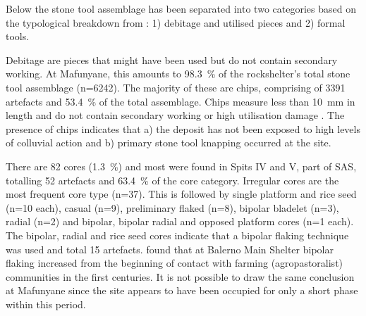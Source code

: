 \documentclass{ijsra}
\begin{document}
Below the stone tool assemblage has been separated into two categories based on the typological breakdown from \textcite{Walker_1994}: 1) debitage and utilised pieces and 2) formal tools.

Debitage are  pieces that might have been used but do not contain secondary working. 
At Mafunyane, this amounts to \SI{98.3}{\percent} of the rockshelter’s total stone tool assemblage (n=\num{6242}). 
The majority of these are chips, comprising of \num{3391} artefacts and \SI{53.4}{\percent} of the total assemblage. 
Chips measure less than \SI{10}{\milli\meter}
  in length and do not contain secondary working or high utilisation damage \parencite[see][]{Deacon_1984a}. 
 The presence of chips indicates that a) the deposit has not been exposed to high levels of colluvial action \parencite{Kuman_2009} and b) primary stone tool knapping occurred at the site.

There are 82 cores (\SI{1.3}{\percent}) and most were found in Spits IV and V, part of SAS, totalling 52 artefacts and \SI{63.4}{\percent} of the core category. 
Irregular cores are the most frequent core type (n=37). 
This is followed by single platform and rice seed (n=10 each), casual (n=9), preliminary flaked (n=8), bipolar bladelet (n=3), radial (n=2) and bipolar, bipolar radial and opposed platform cores (n=1 each). 
The bipolar, radial and rice seed cores indicate that a bipolar flaking technique was used \parencite[see][]{vanDoornum_2005}
 and total 15 artefacts. 
 \textcite[259]{vanDoornum_2008} found that at Balerno Main Shelter bipolar flaking increased from the beginning of contact with farming (agropastoralist) communities in the first centuries\AD. 
 It is not possible to draw the same conclusion at Mafunyane since the site appears to have been occupied for only a short phase within this period.
 
\end{document}
